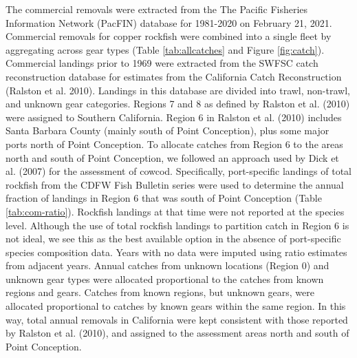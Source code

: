 \documentclass[11pt,
  english,
  a4paper,
]{article}
\begin{document}
The commercial removals were extracted from the The Pacific Fisheries Information Network (PacFIN) database for 1981-2020 on February 21, 2021. Commercial removals for copper rockfish were combined into a single fleet by aggregating across gear types (Table \ref{tab:allcatches} and Figure \ref{fig:catch}). Commercial landings prior to 1969 were extracted from the SWFSC catch reconstruction database for estimates from the California Catch Reconstruction {(Ralston et al. 2010)\leavevmode\tagmcend\tagstructend}. Landings in this database are divided into trawl, non-trawl, and unknown gear categories. Regions 7 and 8 as defined by Ralston et al. {(2010)\leavevmode\tagmcend\tagstructend} were assigned to Southern California. Region 6 in Ralston et al. {(2010)\leavevmode\tagmcend\tagstructend} includes Santa Barbara County (mainly south of Point Conception), plus some major ports north of Point Conception. To allocate catches from Region 6 to the areas north and south of Point Conception, we followed an approach used by Dick et al. {(2007)\leavevmode\tagmcend\tagstructend} for the assessment of cowcod. Specifically, port-specific landings of total rockfish from the CDFW Fish Bulletin series were used to determine the annual fraction of landings in Region 6 that was south of Point Conception (Table \ref{tab:com-ratio}). Rockfish landings at that time were not reported at the species level. Although the use of total rockfish landings to partition catch in Region 6 is not ideal, we see this as the best available option in the absence of port-specific species composition data. Years with no data were imputed using ratio estimates from adjacent years. Annual catches from unknown locations (Region 0) and unknown gear types were allocated proportional to the catches from known regions and gears. Catches from known regions, but unknown gears, were allocated proportional to catches by known gears within the same region. In this way, total annual removals in California were kept consistent with those reported by Ralston et al. {(2010)\leavevmode\tagmcend\tagstructend}, and assigned to the assessment areas north and south of Point Conception.

\leavevmode\tagmcend\tagstructend\par
\end{document}
